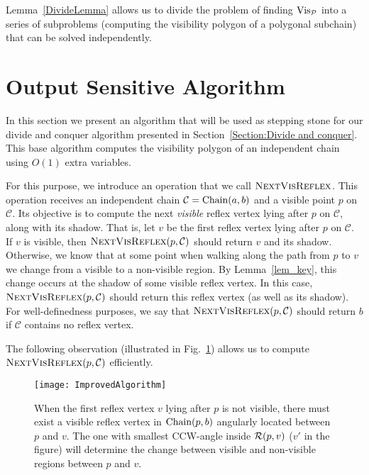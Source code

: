 \documentclass[a4paper]{article}
\newcommand{\C}{\ensuremath{{\mathcal C}}}
\begin{document}
Lemma~\ref{DivideLemma} allows us to divide the problem of finding $\mathrm{Vis}_{\mathcal{P}}$ into a series of subproblems (computing the visibility polygon of a polygonal subchain) that can be solved independently.

\fi
 



\section{Output Sensitive Algorithm}\label{section:SequentialAlgorithms}
In this section we present an algorithm that will be used as stepping stone for our divide and conquer algorithm presented in  Section~\ref{Section:Divide and conquer}.
This base algorithm computes the visibility polygon of an independent chain using $O(1)$ extra variables.

For this purpose, we introduce an operation that we call $\textsc{NextVisReflex}$. 
This operation receives an independent chain $\C=\chain(a,b)$ and a visible point $p$ on $\C$. 
Its objective is to compute the next \emph{visible} reflex vertex lying after $p$ on \C, along with its shadow. That is, let $v$ be the first reflex vertex lying after $p$ on $\C$. If $v$ is visible, then $\textsc{NextVisReflex}(p,\C)$ should return $v$ and its shadow. Otherwise, we know that at some point when walking along the path from $p$ to $v$ we change from a visible to a non-visible region. By Lemma~\ref{lem_key}, this change occurs at the shadow of some visible reflex vertex. In this case,  $\textsc{NextVisReflex}(p,\C)$ should return this reflex vertex (as well as its shadow). For well-definedness purposes, we say that $\textsc{NextVisReflex}(p,\C)$ should return $b$ if $\C$ contains no reflex vertex.

The following observation (illustrated in Fig.~\ref{fig:ImprovedAlgorithm}) allows us to compute $\textsc{NextVisReflex}(p,\C)$ efficiently. 

\begin{figure}[tb]
  \centering
\texttt{[image: ImprovedAlgorithm]}
\caption {\small When the first reflex vertex $v$ lying after $p$ is not visible, there must exist a visible reflex vertex in ${\mathrm{Chain}}(p,b)$ angularly located between $p$ and $v$. The one with smallest CCW-angle inside ${{\mathcal R}}(p,v)$ ($v'$ in the figure) will determine the change between visible and non-visible regions between $p$ and $v$.}
\label{fig:ImprovedAlgorithm}
\end{figure}
\end{document}

